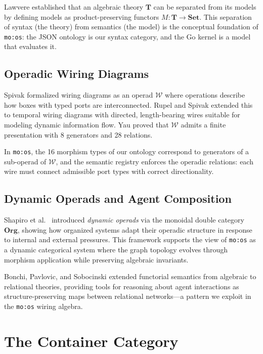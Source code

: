 \documentclass[submission,copyright,creativecommons]{eptcs}
\begin{document}
Lawvere \cite{lawvere1963} established that an algebraic theory $\mathbf{T}$
can be separated from its models by defining models as product-preserving
functors $M\colon \mathbf{T} \to \mathbf{Set}$. This separation of syntax
(the theory) from semantics (the model) is the conceptual foundation of
\texttt{mo:os}: the JSON ontology is our syntax category, and the Go kernel is
a model that evaluates it.

\subsection{Operadic Wiring Diagrams}

Spivak \cite{spivak2013} formalized wiring diagrams as an operad
$\mathcal{W}$ where operations describe how boxes with typed ports are
interconnected. Rupel and Spivak \cite{spivak2013operad} extended this to
temporal wiring diagrams with directed, length-bearing wires suitable for
modeling dynamic information flow. Yau \cite{yau2018} proved that
$\mathcal{W}$ admits a finite presentation with 8 generators and 28 relations.

In \texttt{mo:os}, the 16 morphism types of our ontology correspond to
generators of a sub-operad of $\mathcal{W}$, and the semantic registry
enforces the operadic relations: each wire must connect admissible port types
with correct directionality.

\subsection{Dynamic Operads and Agent Composition}

Shapiro et al.\ \cite{shapiro2022} introduced \emph{dynamic operads} via the
monoidal double category $\mathbf{Org}$, showing how organized systems adapt
their operadic structure in response to internal and external pressures. This
framework supports the view of \texttt{mo:os} as a dynamic categorical system
where the graph topology evolves through morphism application while preserving
algebraic invariants.

Bonchi, Pavlovic, and Sobocinski \cite{bonchi2017functorial} extended
functorial semantics from algebraic to relational theories, providing tools for
reasoning about agent interactions as structure-preserving maps between
relational networks---a pattern we exploit in the \texttt{mo:os} wiring
algebra.

\section{The Container Category}
\label{sec:container}
\end{document}
